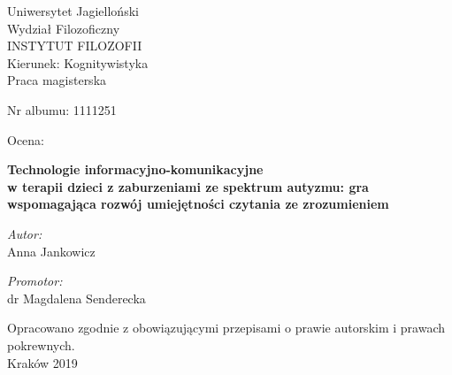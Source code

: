 \documentclass[a4paper,12pt]{report}
\title{\titlepl}
\author{\authorname}
\date{2019}
\newcommand{\authorname}{Anna Jankowicz}
\newcommand{\supname}{dr Magdalena Senderecka}
\newcommand{\titlepl}{Technologie informacyjno-komunikacyjne\\w terapii dzieci z zaburzeniami ze spektrum autyzmu: gra wspomagająca rozwój umiejętności czytania ze zrozumieniem}
\begin{document}

\thispagestyle{empty}

\vspace*{0.5cm}
{\centering\linespread{1.5}
    {\Large Uniwersytet Jagielloński\\Wydział Filozoficzny\\
        \uppercase{Instytut Filozofii}\\}
    {\large Kierunek: Kognitywistyka\\Praca magisterska\\}
}

\vspace{1cm}
\begin{minipage}[t]{0.4\textwidth}
    \begin{flushleft} \large Nr albumu: 1111251\\ \end{flushleft}
\end{minipage}
\begin{minipage}[t]{0.4\textwidth}
    \begin{flushright} \large Ocena:\\ \end{flushright}
\end{minipage}
\vspace{1cm}

{\centering\linespread{1.5}\LARGE\textbf{\titlepl\\}}

\vspace{2cm}
\begin{minipage}[t]{0.4\textwidth}
    \begin{flushleft} \large
    \emph{Autor:}\\ \authorname
    \end{flushleft}
\end{minipage}
\begin{minipage}[t]{0.5\textwidth}
    \begin{flushright} \large
    \emph{Promotor:}\\ \supname
    \end{flushright}
\end{minipage}
\vspace{1.75cm}

{\centering Opracowano zgodnie z obowiązującymi przepisami o prawie autorskim i prawach pokrewnych.\\ \vspace{0.25cm}\large{Kraków 2019\\}}
\end{document}
